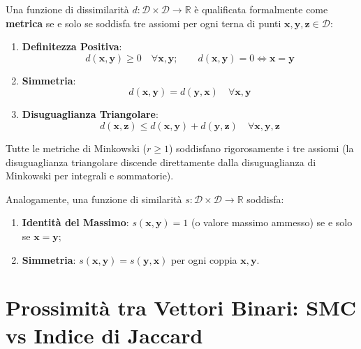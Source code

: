\begin{definition}
Una funzione di dissimilarità $d: \mathcal{D} \times \mathcal{D} \to \mathbb{R}$ è qualificata formalmente come \textbf{metrica} se e solo se soddisfa tre assiomi per ogni terna di punti $\mathbf{x}, \mathbf{y}, \mathbf{z} \in \mathcal{D}$:
\begin{enumerate}
    \item \textbf{Definitezza Positiva}:
    \begin{equation}
        d(\mathbf{x}, \mathbf{y}) \ge 0 \quad \forall \mathbf{x}, \mathbf{y}; \qquad d(\mathbf{x}, \mathbf{y}) = 0 \iff \mathbf{x} = \mathbf{y}
    \end{equation}
    \item \textbf{Simmetria}:
    \begin{equation}
        d(\mathbf{x}, \mathbf{y}) = d(\mathbf{y}, \mathbf{x}) \quad \forall \mathbf{x}, \mathbf{y}
    \end{equation}
    \item \textbf{Disuguaglianza Triangolare}:
    \begin{equation}
        d(\mathbf{x}, \mathbf{z}) \le d(\mathbf{x}, \mathbf{y}) + d(\mathbf{y}, \mathbf{z}) \quad \forall \mathbf{x}, \mathbf{y}, \mathbf{z}
    \end{equation}
\end{enumerate}
\end{definition}

Tutte le metriche di Minkowski ($r \ge 1$) soddisfano rigorosamente i tre assiomi (la disuguaglianza triangolare discende direttamente dalla disuguaglianza di Minkowski per integrali e sommatorie).

Analogamente, una funzione di similarità $s: \mathcal{D} \times \mathcal{D} \to \mathbb{R}$ soddisfa:
\begin{enumerate}[noitemsep]
    \item \textbf{Identità del Massimo}: $s(\mathbf{x}, \mathbf{y}) = 1$ (o valore massimo ammesso) se e solo se $\mathbf{x} = \mathbf{y}$;
    \item \textbf{Simmetria}: $s(\mathbf{x}, \mathbf{y}) = s(\mathbf{y}, \mathbf{x})$ per ogni coppia $\mathbf{x}, \mathbf{y}$.
\end{enumerate}

\section{Prossimità tra Vettori Binari: SMC vs Indice di Jaccard}
\label{sec:dm-binary-proximity-jaccard}


